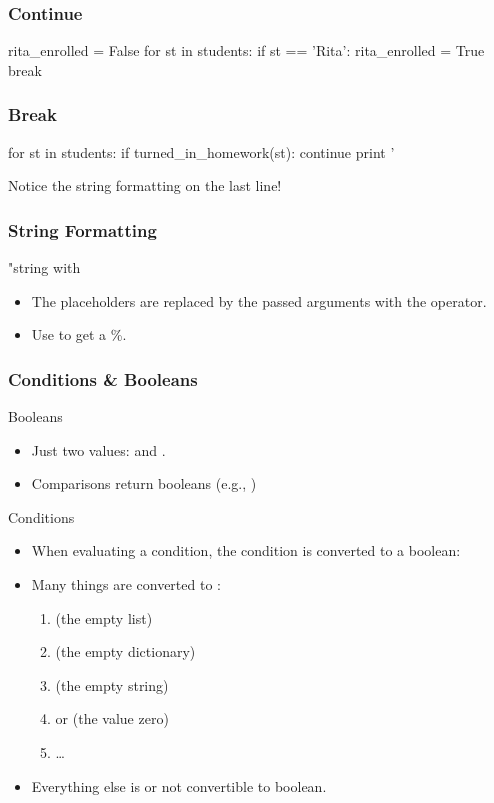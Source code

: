 \begin{frame}[fragile]
\frametitle{Continue}
\begin{python}
rita_enrolled = False
for st in students:
    if st == 'Rita':
        rita_enrolled = True
        break
\end{python}

\end{frame}

\begin{frame}[fragile]
\frametitle{Break}
\begin{python}
for st in students:
    if turned_in_homework(st):
        continue
    print '%
\end{python}

Notice the string formatting on the last line!
\end{frame}

\begin{frame}[fragile]
\frametitle{String Formatting}
\begin{python}
"string with %
\end{python}

\begin{itemize}
\item The  placeholders are replaced by the passed arguments with the \code{\%} operator.
\item Use \code{\%\%} to get a \%.
\end{itemize}

\end{frame}

\begin{frame}[fragile]
\frametitle{Conditions \& Booleans}
\begin{block}{Booleans}
\begin{itemize}
\item Just two values:  and .
\item Comparisons return booleans (e.g., )
\end{itemize}
\end{block}

\begin{block}{Conditions}
\begin{itemize}
\item When evaluating a condition, the condition is converted to a boolean:
\item Many things are converted to :
\begin{enumerate}
\item \code{$[]$} (the empty list)
\item \code{$\{ \}$} (the empty dictionary)
\item {} (the empty string)
\item {} or  (the value zero)
\item \ldots
\end{enumerate}
\item Everything else is  or not convertible to boolean.
\end{itemize}
\end{block}
\end{frame}

